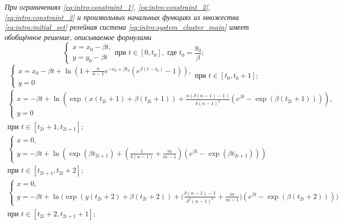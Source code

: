 \textit{При ограничениях \eqref{eq:intro:constraint_1}, \eqref{eq:intro:constraint_2}, \eqref{eq:intro:constraint_3}  и произвольных начальных функциях из множества \eqref{eq:intro:initial_set} релейная система \eqref{eq:intro:system_cluster_main} имеет обобщённое решение, описываемое формулами}
%
\small
\begin{equation}
	\label{eq:intro:step1_solution}
	\begin{cases}
		x = x_0 - \beta t,\\
		y = y_0 - \beta t
	\end{cases}
	\text{при } t \in [0, t_0], \text{ где } t_0 = \dfrac{y_0}{\beta};
\end{equation}
%
\begin{equation}
	\label{eq:intro:step2_solution}
	\begin{cases}
		x = x_0 - \beta t + \ln\left(1 + \frac{n}{n - 1} e^{-x_0 + \beta t_0}  (e^{\beta  (t - t_0)} - 1)\right),\\
		y = 0
	\end{cases}
	\text{при } t \in [t_0, t_0 + 1];
\end{equation}
%
\begin{multline}
	\label{eq:intro:step3_solution}
	\begin{cases}
		x = -\beta t + \ln\left(\exp(x(t_{2i} + 1) + \beta (t_{2i} + 1)) + \frac{n (\delta(n - 1) - 1)}{\delta (n - 1)^2} (e^{\beta t} - \exp(\beta (t_{2i} + 1)))\right)
		,\\
		y = 0
	\end{cases}\\
	\text{при } t \in [t_{2i} + 1, t_{2i + 1}];
\end{multline}
%
\begin{multline}
	\label{eq:intro:step4_solution}
	\begin{cases}
		x = 0,\\
		y = -\beta t + \ln\left(\exp(\beta t_{2i + 1}) + \left(\frac{1}{\delta(n - 1)} + \frac{m}{m - 1}\right) (e^{\beta t} - \exp(\beta t_{2i + 1}))\right)
	\end{cases}\\
	\text{при } t \in [t_{2i + 1}, t_{2i} + 2];
\end{multline}
%
\begin{multline}
	\label{eq:intro:step5_solution}
	\begin{cases}
		x = 0,\\
		y = -\beta t + \ln\bigg(\exp(y(t_{2i} + 2) + \beta (t_{2i} + 2)) + \bigg(\frac{\delta(n - 1) - 1}{\delta^2 (n - 1)^2} + \frac{m}{m - 1}\bigg) (e^{\beta t} - \exp(\beta (t_{2i} + 2)))\bigg)
	\end{cases}\\
	\text{при } t \in [t_{2i} + 2, t_{2i + 1} + 1];
\end{multline}
